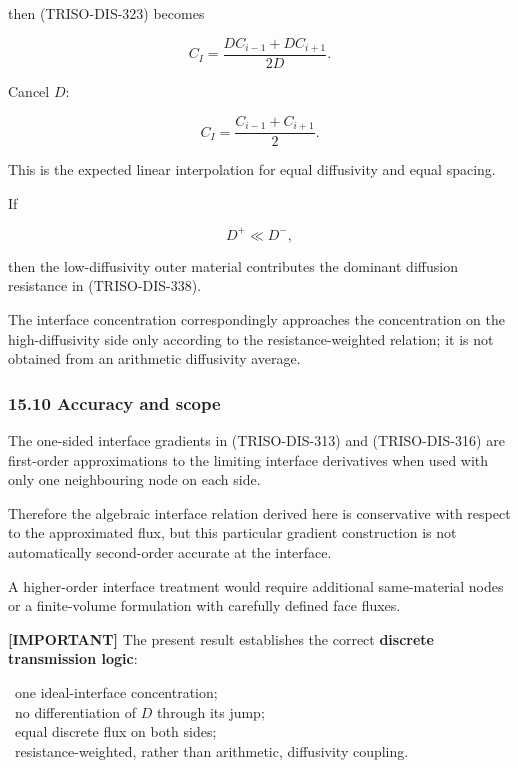 \documentclass[11pt,a4paper]{article}
\begin{document}
then (TRISO-DIS-323) becomes

\begin{equation}
C_I
=
\frac{
DC_{i-1}+DC_{i+1}
}{
2D
}.
\tag{TRISO-DIS-347}
\label{eq:triso-dis-347}
\end{equation}

Cancel $D$:

\begin{equation}
\boxed{
C_I
=
\frac{
C_{i-1}+C_{i+1}
}{2}.
}
\tag{TRISO-DIS-348}
\label{eq:triso-dis-348}
\end{equation}

This is the expected linear interpolation for equal diffusivity and equal spacing.

If

\begin{equation}
D^+\ll D^-,
\tag{TRISO-DIS-349}
\label{eq:triso-dis-349}
\end{equation}

then the low-diffusivity outer material contributes the dominant diffusion resistance in (TRISO-DIS-338).

The interface concentration correspondingly approaches the concentration on the high-diffusivity side only according to the resistance-weighted relation; it is not obtained from an arithmetic diffusivity average.

\subsubsection*{15.10 Accuracy and scope}

The one-sided interface gradients in (TRISO-DIS-313) and (TRISO-DIS-316) are first-order approximations to the limiting interface derivatives when used with only one neighbouring node on each side.

Therefore the algebraic interface relation derived here is conservative with respect to the approximated flux, but this particular gradient construction is not automatically second-order accurate at the interface.

A higher-order interface treatment would require additional same-material nodes or a finite-volume formulation with carefully defined face fluxes.

\textbf{[IMPORTANT]} The present result establishes the correct \textbf{discrete transmission logic}:

\noindent\textbullet\ one ideal-interface concentration;\\
\noindent\textbullet\ no differentiation of $D$ through its jump;\\
\noindent\textbullet\ equal discrete flux on both sides;\\
\noindent\textbullet\ resistance-weighted, rather than arithmetic, diffusivity coupling.\\
\end{document}
